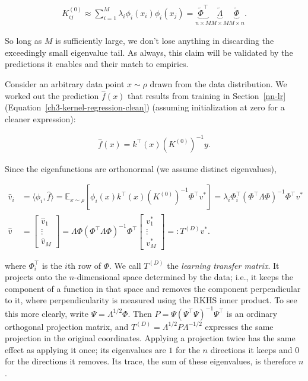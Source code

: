 \begin{align}
K^{(0)}_{ij} \approx \sum^{M}_{i=1} \lambda_i \phi_i(x_i) \phi_i(x_j) = \underbrace{\tilde{\Phi}^\top}_{n\times M} \underbrace{\tilde{\Lambda}}_{M\times M}\underbrace{\tilde{\Phi}}_{M\times n}.
\end{align}

So long as $M$ is sufficiently large, we don't lose anything in discarding the exceedingly small eigenvalue tail. As always, this claim will be validated by the predictions it enables and their match to empirics.

Consider an arbitrary data point $x\sim \rho$ drawn from the data distribution.
We worked out the prediction $\hat{f}(x)$ that results from training in Section~\ref{nn-lr} (Equation~\eqref{ch3-kernel-regression-clean}) (assuming initialization at zero for a cleaner expression):

\begin{align}
    {\hat{f}}(x) =  k^\top(x)(K^{(0)})^{-1}y.
\end{align}

Since the eigenfunctions are orthonormal (we assume distinct eigenvalues),

\begin{align}
\hat{v}_i &= \langle \phi_i,\hat{f} \rangle = \mathbb{E}_{x\sim\rho}\left[\phi_i(x)k^\top(x)(K^{(0)})^{-1} \Phi^\top v^* \right]
= \lambda_i \Phi^\top_i (\Phi^\top \Lambda \Phi)^{-1} \Phi^\top v^*\\
\hat{v} &= 
\begin{bmatrix}
\hat{v}_1 \\
\vdots \\
\hat{v}_M
\end{bmatrix} = \Lambda \Phi (\Phi^\top \Lambda \Phi)^{-1} \Phi^\top 
\begin{bmatrix}
v^*_1 \\
\vdots \\
v^*_M
\end{bmatrix}
=: T^{(D)}v^*.
\end{align}

where $\Phi^\top_i$ is the $i$th row of $\Phi$. We call $T^{(D)}$ the \textit{learning transfer matrix}. It projects onto the $n$-dimensional space determined by the data; i.e., it keeps the component of a function in that space and removes the component perpendicular to it, where perpendicularity is measured using the RKHS inner product. To see this more clearly, write $\Psi=\Lambda^{1/2}\Phi$. Then $P=\Psi(\Psi^\top\Psi)^{-1}\Psi^\top$ is an ordinary orthogonal projection matrix, and $T^{(D)}=\Lambda^{1/2}P\Lambda^{-1/2}$ expresses the same projection in the original coordinates. Applying a projection twice has the same effect as applying it once; its eigenvalues are $1$ for the $n$ directions it keeps and $0$ for the directions it removes. Its trace, the sum of these eigenvalues, is therefore $n$.

